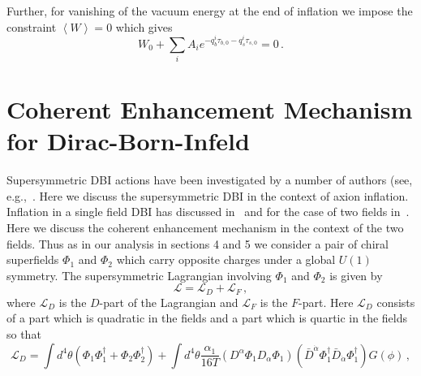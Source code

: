 \documentclass[12pt]{article}
\begin{document}
Further, for vanishing of the vacuum energy at the end of inflation we impose the constraint $\left<W\right> = 0$ which gives
\begin{equation}
  W_0 + \sum_i A_i e^{-q_b^i \tau_{b, 0} - q_s^i \tau_{s, 0}} = 0\,.
\end{equation}


\section{Coherent Enhancement Mechanism for Dirac-Born-Infeld \label{sec:DBI}}
Supersymmetric DBI actions have been investigated by a number of authors (see, e.g.,~\cite{Khoury:2010gb, Khoury:2011da, Baumann:2011nk, Baumann:2011nm, Rocek:1997hi, Tseytlin:1999dj, Ito:2007hy, Billo:2008sp, Sasaki:2012ka, Aoki:2016tod}.
Here we discuss the supersymmetric DBI in the context of axion inflation.
Inflation in a single field DBI has discussed in~\cite{Sasaki:2012ka} and for the case of two fields in~\cite{Nath:2018xxe}.
Here we discuss the coherent enhancement mechanism in the context of the two fields.
Thus as in our analysis in sections 4 and 5 we consider a pair of chiral superfields $\Phi_1$ and $\Phi_2$ which carry opposite charges under a global $U\left(1\right)$ symmetry.
The supersymmetric Lagrangian involving $\Phi_1$ and $\Phi_2$ is given by
\begin{equation} \label{eq:DBI:lagrangianTerms}
  \mathcal{L} = \mathcal{L}_D + \mathcal{L}_F\,,
\end{equation}
where $\mathcal{L}_D$ is the $D$-part of the Lagrangian and $\mathcal{L}_F$ is the $F$-part.
Here $\mathcal{L}_D$ consists of a part which is quadratic in the fields and a part which is quartic in the fields so that
\begin{equation} \label{eq:DBI:lagrangianD}
  \mathcal{L}_D = \int d^4 \theta \left(\Phi_1 \Phi_1^\dagger + \Phi_2 \Phi_2^\dagger\right)
    + \int d^4 \theta \frac{\alpha_1}{16 T}
      \left(D^\alpha \Phi_1 D_\alpha \Phi_1\right)
      \left({\bar D}^{\dot\alpha} \Phi_1^\dagger {\bar D}_{\dot\alpha} \Phi_1^\dagger\right)
      G\left(\phi\right)\,,
\end{equation}
\end{document}
